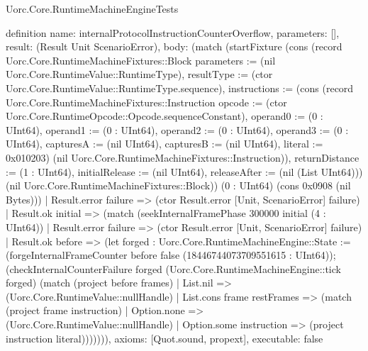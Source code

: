 \begin{lexlean}{Uorc.Core.RuntimeMachineEngineTests}
\begin{semanticmodule}
definition{
  name: internalProtocolInstructionCounterOverflow,
  parameters: [],
  result: (Result Unit ScenarioError),
  body: (match (startFixture (cons (record Uorc.Core.RuntimeMachineFixtures::Block {parameters := (nil Uorc.Core.RuntimeValue::RuntimeType), resultType := (ctor Uorc.Core.RuntimeValue::RuntimeType.sequence), instructions := (cons (record Uorc.Core.RuntimeMachineFixtures::Instruction {opcode := (ctor Uorc.Core.RuntimeOpcode::Opcode.sequenceConstant), operand0 := (0 : UInt64), operand1 := (0 : UInt64), operand2 := (0 : UInt64), operand3 := (0 : UInt64), capturesA := (nil UInt64), capturesB := (nil UInt64), literal := 0x010203}) (nil Uorc.Core.RuntimeMachineFixtures::Instruction)), returnDistance := (1 : UInt64), initialRelease := (nil UInt64), releaseAfter := (nil (List UInt64))}) (nil Uorc.Core.RuntimeMachineFixtures::Block)) (0 : UInt64) (cons 0x0908 (nil Bytes)))
    | Result.error failure => (ctor Result.error [Unit, ScenarioError] failure)
    | Result.ok initial => (match (seekInternalFramePhase 300000 initial (4 : UInt64))
      | Result.error failure => (ctor Result.error [Unit, ScenarioError] failure)
      | Result.ok before => (let forged : Uorc.Core.RuntimeMachineEngine::State := (forgeInternalFrameCounter before false (18446744073709551615 : UInt64)); (checkInternalCounterFailure forged (Uorc.Core.RuntimeMachineEngine::tick forged) (match (project before frames)
        | List.nil => (Uorc.Core.RuntimeValue::nullHandle)
        | List.cons frame restFrames => (match (project frame instruction)
          | Option.none => (Uorc.Core.RuntimeValue::nullHandle)
          | Option.some instruction => (project instruction literal))))))),
  axioms: [Quot.sound, propext],
  executable: false
}


\end{semanticmodule}
\end{lexlean}
